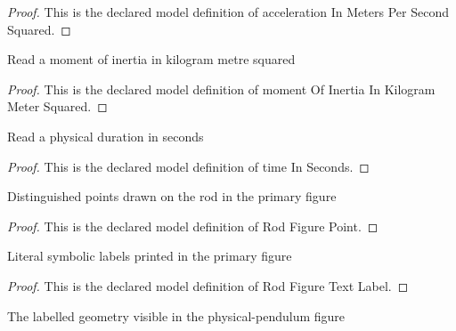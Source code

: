 \begin{proof}
  This is the declared model definition of acceleration In Meters Per Second Squared.
\end{proof}
\begin{definition}
  \label{def:physics:phyx-mini-0266:phyxminiproblems-problemphyxmini0266-momentofinertiainkilogrammetersquared}
  Read a moment of inertia in kilogram metre squared
\end{definition}
\begin{proof}
  This is the declared model definition of moment Of Inertia In Kilogram Meter Squared.
\end{proof}
\begin{definition}
  \label{def:physics:phyx-mini-0266:phyxminiproblems-problemphyxmini0266-timeinseconds}
  Read a physical duration in seconds
\end{definition}
\begin{proof}
  This is the declared model definition of time In Seconds.
\end{proof}
\begin{definition}
  \label{def:physics:phyx-mini-0266:phyxminiproblems-problemphyxmini0266-rodfigurepoint}
  Distinguished points drawn on the rod in the primary figure
\end{definition}
\begin{proof}
  This is the declared model definition of Rod Figure Point.
\end{proof}
\begin{definition}
  \label{def:physics:phyx-mini-0266:phyxminiproblems-problemphyxmini0266-rodfiguretextlabel}
  Literal symbolic labels printed in the primary figure
\end{definition}
\begin{proof}
  This is the declared model definition of Rod Figure Text Label.
\end{proof}
\begin{definition}
  \label{def:physics:phyx-mini-0266:phyxminiproblems-problemphyxmini0266-uniformrodpendulumfigure}
  The labelled geometry visible in the physical-pendulum figure
\end{definition}
